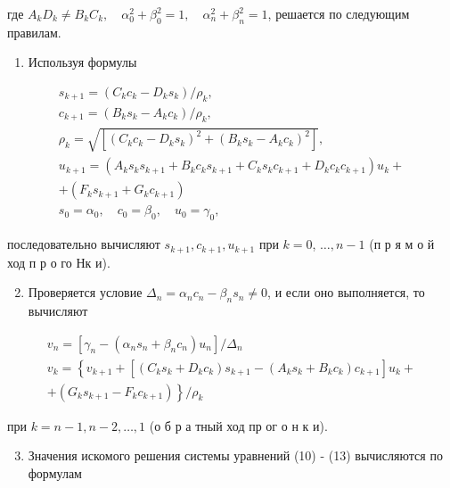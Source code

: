 \documentclass[10pt]{article}
\begin{document}
где $A_{k} D_{k} \neq B_{k} C_{k}, \quad \alpha_{0}^{2}+\beta_{0}^{2}=1, \quad \alpha_{n}^{2}+\beta_{n}^{2}=1$, решается по следующим правилам.

\begin{enumerate}
  \item Используя формулы
\end{enumerate}

\[
\begin{gathered}
s_{k+1}=\left(C_{k} c_{k}-D_{k} s_{k}\right) / \rho_{k}, \\
c_{k+1}=\left(B_{k} s_{k}-A_{k} c_{k}\right) / \rho_{k}, \\
\rho_{k}=\sqrt{\left[\left(C_{k} c_{k}-D_{k} s_{k}\right)^{2}+\left(B_{k} s_{k}-A_{k} c_{k}\right)^{2}\right]}, \\
u_{k+1}=\left(A_{k} s_{k} s_{k+1}+B_{k} c_{k} s_{k+1}+C_{k} s_{k} c_{k+1}+D_{k} c_{k} c_{k+1}\right) u_{k}+ \\
+\left(F_{k} s_{k+1}+G_{k} c_{k+1}\right) \\
s_{0}=\alpha_{0}, \quad c_{0}=\beta_{0}, \quad u_{0}=\gamma_{0},
\end{gathered}
\]

последовательно вычисляют $s_{k+1}, c_{k+1}, u_{k+1}$ при $k=0$, $\ldots, n-1$ (п р я м о й ход п р о го Нк и).

\begin{enumerate}
  \setcounter{enumi}{1}
  \item Проверяется условие $\Delta_{n}=\alpha_{n} c_{n}-\beta_{n} s_{n} \neq 0$, и если оно выполняется, то вычисляют
\end{enumerate}

\[
\begin{gathered}
v_{n}=\left[\gamma_{n}-\left(\alpha_{n} s_{n}+\beta_{n} c_{n}\right) u_{n}\right] / \Delta_{n} \\
v_{k}=\left\{v_{k+1}+\left[\left(C_{k} s_{k}+D_{k} c_{k}\right) s_{k+1}-\left(A_{k} s_{k}+B_{k} c_{k}\right) c_{k+1}\right] u_{k}+\right. \\
\left.+\left(G_{k} s_{k+1}-F_{k} c_{k+1}\right)\right\} / \rho_{k}
\end{gathered}
\]

при $k=n-1, n-2, \ldots, 1$ (о б р а тный ход пр ог о н к и).

\begin{enumerate}
  \setcounter{enumi}{2}
  \item Значения искомого решения системы уравнений (10) - (13) вычисляются по формулам
\end{enumerate}
\end{document}
